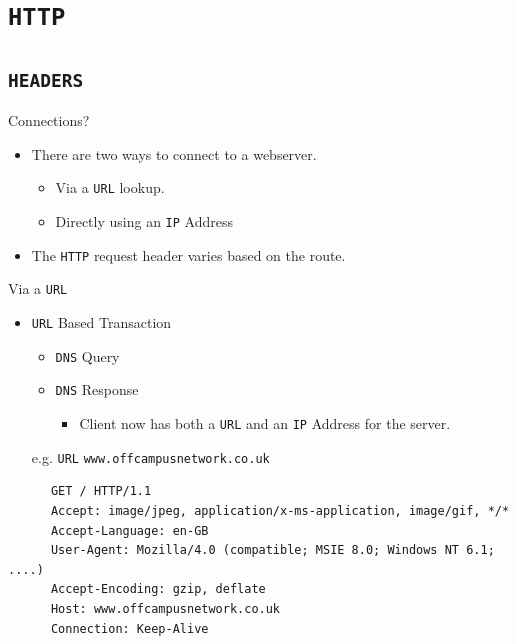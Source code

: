 \documentclass[xcolor=table,aspectratio=169]{beamer}
\begin{document}
\section{\texttt{HTTP}}
\subsection{\texttt{HEADERS}}
\begin{frame}{Connections?}
  \begin{itemize}
    \item There are two ways to connect to a webserver.
      \begin{itemize}
        \item Via a \texttt{URL} lookup.
        \item Directly using an \texttt{IP} Address
      \end{itemize}
    \item The \texttt{HTTP} request header varies based on the route.
  \end{itemize}
\end{frame}

\begin{frame}[fragile]{Via a \texttt{URL}}
  \begin{itemize}
      \item \texttt{URL} Based Transaction
      \begin{itemize}
        \item \texttt{DNS} Query
        \item \texttt{DNS} Response
          \begin{itemize}
            \item Client now has both a \texttt{URL} and an \texttt{IP} Address for the server.
          \end{itemize}
      \end{itemize}
      \begin{center}
        e.g. \texttt{URL} \texttt{www.offcampusnetwork.co.uk}        
      \end{center}
    \end{itemize}
  \begin{tcolorbox}
    \lstset{
      basicstyle=\tiny\ttfamily,
    }
    \begin{lstlisting}
      GET / HTTP/1.1
      Accept: image/jpeg, application/x-ms-application, image/gif, */*
      Accept-Language: en-GB
      User-Agent: Mozilla/4.0 (compatible; MSIE 8.0; Windows NT 6.1; ....)
      Accept-Encoding: gzip, deflate
      Host: www.offcampusnetwork.co.uk
      Connection: Keep-Alive
    \end{lstlisting}
  \end{tcolorbox}
\end{frame}
\end{document}
